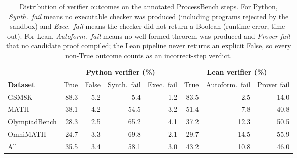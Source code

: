 \begin{table}[ht]
\centering
\small
\begin{tabular}{lrrrrrrr}
\hline
& \multicolumn{4}{c}{\textbf{Python verifier (\%)}} & \multicolumn{3}{c}{\textbf{Lean verifier (\%)}} \\
\cmidrule(lr){2-5}\cmidrule(lr){6-8}
\textbf{Dataset} & True & False & Synth.\ fail & Exec.\ fail & True & Autoform.\ fail & Prover fail \\
\hline
GSM8K & 88.3 & 5.2 & 5.4 & 1.2 & 83.5 & 2.5 & 14.0 \\
MATH & 38.1 & 4.2 & 54.5 & 3.2 & 51.4 & 7.8 & 40.8 \\
OlympiadBench & 28.3 & 2.5 & 65.2 & 4.1 & 37.2 & 12.3 & 50.5 \\
OmniMATH & 24.7 & 3.3 & 69.8 & 2.1 & 29.7 & 14.5 & 55.9 \\
\hline
All & 35.5 & 3.4 & 58.1 & 3.0 & 43.2 & 10.8 & 46.0 \\
\hline
\end{tabular}
\caption{Distribution of verifier outcomes on the annotated ProcessBench steps. For Python, \emph{Synth.\ fail} means no executable checker was produced (including programs rejected by the sandbox) and \emph{Exec.\ fail} means the checker did not return a Boolean (runtime error, time-out). For Lean, \emph{Autoform.\ fail} means no well-formed theorem was produced and \emph{Prover fail} that no candidate proof compiled; the Lean pipeline never returns an explicit False, so every non-True outcome counts as an incorrect-step verdict.}
\label{tab:verifier_outcomes}
\end{table}
